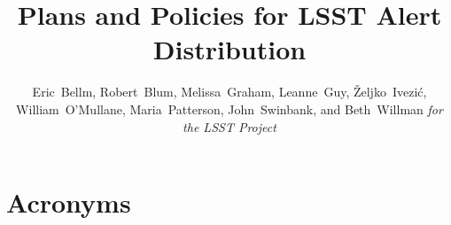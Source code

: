 \documentclass[DM,toc,lsstdraft]{lsstdoc}
\title{Plans and Policies for LSST Alert Distribution}
\author{
Eric~Bellm,
Robert~Blum,
Melissa~Graham,
Leanne~Guy,
\v{Z}eljko~Ivezi\'{c},
William~O'Mullane,
Maria~Patterson,
John~Swinbank,
and Beth~Willman
\emph{for the LSST Project}
}
\begin{document}
\maketitle









\clearpage

\section{Acronyms}



\end{document}
